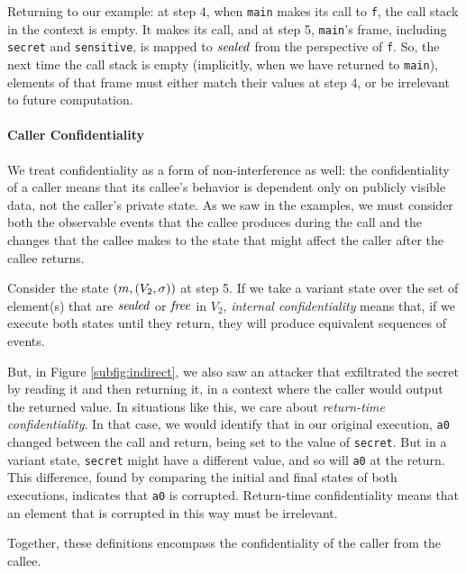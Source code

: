 \documentclass[10pt,conference]{ieeetran}%
\theoremstyle{definition}
\begin{document}
Returning to our example: at step 4, when {\tt main} makes its call to {\tt f},
the call stack in the context is empty. It makes its call, and at step 5, {\tt main}'s
frame, including {\tt secret} and {\tt sensitive}, is mapped to \(\mathit{sealed}\) from the
perspective of {\tt f}. So, the next time the call stack is empty (implicitly, when
we have returned to {\tt main}), elements of that frame must either match their
values at step 4, or be irrelevant to future computation.

\paragraph*{Caller Confidentiality}

We treat confidentiality as a form of non-interference as well: the confidentiality of a caller
means that its callee's behavior is dependent only on publicly visible data,
not the caller's private state. As we saw in the examples, we must consider both the observable events
that the callee produces during the call and the changes that the callee makes to the state that might
affect the caller after the callee returns.

Consider the state \((m, (V_2,\sigma))\) at step 5. If we take a variant state over
the set of element(s) that are \(\mathit{sealed}\) or \(\mathit{free}\) in \(V_2\),
{\it internal confidentiality} means
that, if we execute both states until they return, they will produce equivalent sequences
of events.

But, in Figure \ref{subfig:indirect}, we also saw an attacker that exfiltrated the secret
by reading it and then returning it, in a context where the caller would output the returned
value. In situations like this, we care about {\it return-time confidentiality}.
In that case, we would identify that in our original execution, {\tt a0} changed between
the call and return, being set to the value of {\tt secret}. But in a variant state,
{\tt secret} might have a different value, and so will {\tt a0} at the return.
This difference, found by comparing the initial and final states of both executions,
indicates that {\tt a0} is corrupted. Return-time confidentiality means that
an element that is corrupted in this way must be irrelevant.

Together, these definitions encompass the confidentiality of the caller from the callee.
\end{document}
